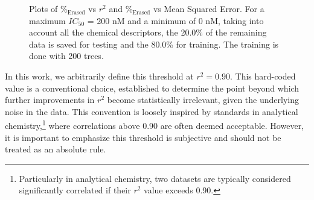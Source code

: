\documentclass[11pt]{article}
\begin{document}
\begin{figure}[H]
\caption{Plots of $\%_{\text{Erased}}$ vs $r^2$ and $\%_{\text{Erased}}$ vs Mean Squared Error. For a maximum $IC_{50}$ = 200 nM and a minimum of 0 nM,  taking into account all the chemical descriptors, the 20.0\% of the remaining data is saved for testing and the  80.0\% for training. The training is done with 200 trees.}
\label{FigPlotErasedPercentageVSRSquare}
\end{figure}

In this work, we arbitrarily define this threshold at $r^2 = 0.90$. This hard-coded value is a conventional choice, established to determine the point beyond which further improvements in $r^2$ become statistically irrelevant, given the underlying noise in the data. This convention is loosely inspired by standards in analytical chemistry,\footnote{Particularly in analytical chemistry, two datasets are typically considered significantly correlated if their $r^2$ value exceeds 0.90.} where correlations above 0.90 are often deemed acceptable. However, it is important to emphasize this threshold is subjective and should not be treated as an absolute rule.
\end{document}
